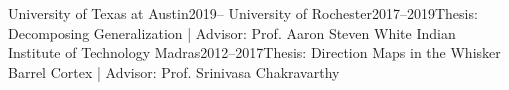     {University of Texas at Austin}{2019--}{}{}
    {University of Rochester}{2017--2019}{Thesis: Decomposing Generalization | Advisor: Prof. Aaron Steven White}{}
    {Indian Institute of Technology Madras}{2012--2017}{Thesis: Direction Maps in the Whisker Barrel Cortex | Advisor: Prof. Srinivasa Chakravarthy}{}